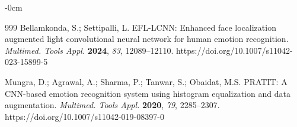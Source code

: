 \documentclass[journal,article,submit,pdftex,moreauthors]{Definitions/mdpi}
\begin{document}
\begin{adjustwidth}{-\extralength}{0cm}
\begin{thebibliography}{999}
		Bellamkonda, S.; Settipalli, L. EFL-LCNN: Enhanced face localization augmented light convolutional neural network for human emotion recognition. {\em Multimed. Tools Appl.} {\bf 2024}, {\em 83}, 12089--12110. https://doi.org/10.1007/s11042-023-15899-5
		
		Mungra, D.; Agrawal, A.; Sharma, P.; Tanwar, S.; Obaidat, M.S. PRATIT: A CNN-based emotion recognition system using histogram equalization and data augmentation. {\em Multimed. Tools Appl.} {\bf 2020}, {\em 79}, 2285--2307. https://doi.org/10.1007/s11042-019-08397-0
		
	\end{thebibliography}
	
	\PublishersNote{}
	
\end{adjustwidth}
\end{document}
